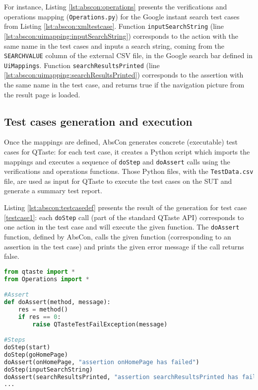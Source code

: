 For instance, Listing \ref{lst:abscon:operations} presents the verifications and operations mapping (\texttt{Operations.py}) for the Google instant search test cases from Listing \ref{lst:abscon:xmltestcase}. Function \texttt{inputSearchString} (line \ref{lst:abscon:uimapping:inputSearchString}) corresponds to the action with the same name in the test cases and inputs a search string, coming from the \texttt{SEARCHVALUE} column of the external CSV file, in the Google search bar defined in \texttt{UiMappings}. Function \texttt{searchResultsPrinted} (line \ref{lst:abscon:uimapping:searchResultsPrinted}) corresponds to the assertion with the same name in the test case, and returns true if the navigation picture from the result page is loaded.

\subsection{Test cases generation and execution}

Once the mappings are defined, AbsCon generates concrete (\ie executable) test cases for QTaste: for each test case, it  creates a Python script which imports the mappings and executes a sequence of \texttt{doStep} and \texttt{doAssert} calls using the verifications and operations functions. Those Python files, with the \texttt{TestData.csv} file, are used as input for QTaste to execute the test cases on the SUT and generate a summary test report.

Listing \ref{lst:abscon:testcasedef} presents the result of the generation for test case \ref{testcase1}: each \texttt{doStep} call (part of the standard QTaste API) corresponds to one action in the test case and will execute the given function. The \texttt{doAssert} function, defined by AbsCon, calls the given function (corresponding to an assertion in the test case) and prints the given error message if the call returns false. 
 
\begin{lstlisting}[language=Python,
float,
label=lst:abscon:testcasedef,
caption={Generation result for test case \ref{testcase1}}]
from qtaste import *
from Operations import *

#Assert
def doAssert(method, message):
	res = method()
	if res == 0:
		raise QTasteTestFailException(message)

#Steps
doStep(start)
doStep(goHomePage)
doAssert(onHomePage, "assertion onHomePage has failed")
doStep(inputSearchString)
doAssert(searchResultsPrinted, "assertion searchResultsPrinted has failed")
...
\end{lstlisting}


